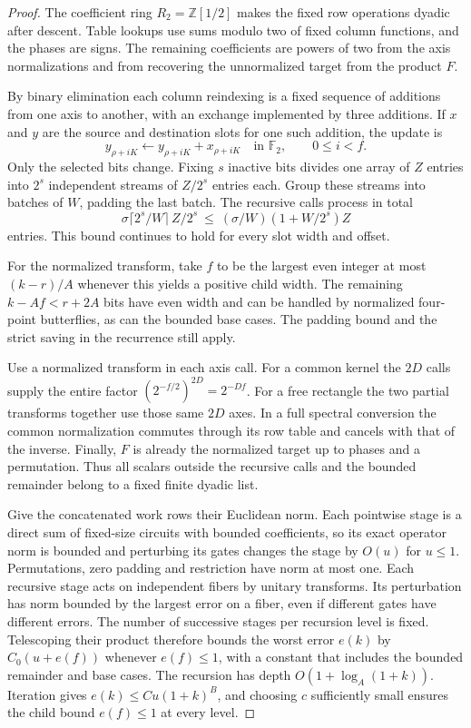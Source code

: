 \begin{proof}
The coefficient ring \(R_2=\mathbb Z[1/2]\) makes the fixed row
operations dyadic after descent. Table lookups use sums modulo two
of fixed column functions, and the phases are signs. The remaining
coefficients are powers of two from the axis normalizations and
from recovering the unnormalized target from the product \(F\).

By binary elimination each column reindexing is a fixed sequence of
additions from one axis to another, with an exchange implemented by
three additions. If \(x\) and \(y\) are the source and destination
slots for one such addition, the update is
\begin{equation}\label{eq:reindex}
 y_{\rho+iK}\longleftarrow y_{\rho+iK}+x_{\rho+iK}
       \quad\text{in }\mathbb F_2,\qquad 0\le i<f .
\end{equation}
Only the selected bits change. Fixing \(s\) inactive bits divides
one array of \(Z\) entries into \(2^s\) independent streams of
\(Z/2^s\) entries each. Group these streams into batches of \(W\),
padding the last batch. The recursive calls process in total
\[
 \sigma\lceil2^s/W\rceil\, Z/2^s
       \ \le\ (\sigma/W)(1+W/2^s) Z
\]
entries. This bound continues to hold for every slot width and offset.

For the normalized transform, take \(f\) to be the largest even
integer at most \((k-r)/A\) whenever this yields a positive child
width. The remaining \(k-Af<r+2A\) bits have even width and can be
handled by normalized four-point butterflies, as can the bounded
base cases. The padding bound and the strict saving in the recurrence
still apply.

Use a normalized transform in each axis call. For a common kernel
the \(2D\) calls supply the entire factor
\((2^{-f/2})^{2D}=2^{-Df}\). For a free rectangle the two partial
transforms together use those same \(2D\) axes. In a full spectral
conversion the common normalization commutes through its row table
and cancels with that of the inverse. Finally, \(F\) is already the
normalized target up to phases and a permutation. Thus all scalars
outside the recursive calls and the bounded remainder belong to a
fixed finite dyadic list.

Give the concatenated work rows their Euclidean norm. Each pointwise
stage is a direct sum of fixed-size circuits with bounded coefficients,
so its exact operator norm is bounded and perturbing its gates changes
the stage by \(O(u)\) for \(u\le1\). Permutations, zero padding and
restriction have norm at most one. Each recursive stage acts on
independent fibers by unitary transforms. Its perturbation has norm
bounded by the largest error on a fiber, even if different gates have
different errors. The number of successive stages per recursion level
is fixed. Telescoping their product therefore bounds the worst error
\(e(k)\) by \(C_0(u+e(f))\) whenever \(e(f)\le1\), with a constant
that includes the bounded remainder and base cases. The recursion
has depth \(O(1+\log_A(1+k))\). Iteration gives
\(e(k)\le Cu(1+k)^B\), and choosing \(c\) sufficiently small ensures
the child bound \(e(f)\le1\) at every level.
\end{proof}

